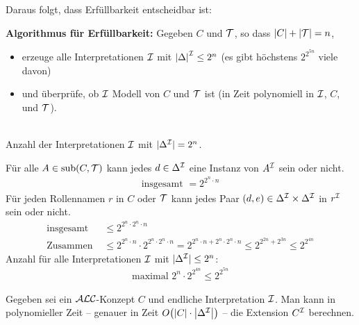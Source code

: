 Daraus folgt, dass Erfüllbarkeit entscheidbar ist:

\textbf{Algorithmus für Erfüllbarkeit:}
Gegeben $C$ und $\mathcal{T}$, so dass $|C|+|\mathcal{T}| = n$,
\begin{itemize} 
  \item erzeuge alle Interpretationen $\mathcal{I}$ mit $\left| \Delta \right|^\MI \leq 2^{n}$ (es gibt höchstens $2^{2^{5n}}$ viele davon) 
  \item und überprüfe, ob $\mathcal{I}$ Modell von $C$ und $\mathcal{T}$ ist (in Zeit polynomiell in $\mathcal{I}$, $C$, und $\mathcal{T}$).
\end{itemize}

\begin{tafel}\mbox{}\\
    Anzahl der Interpretationen $\mathcal{I}$ mit $|\Delta^{\mathcal{I}}| = 2^n$.
    
    Für alle $A \in \operatorname{sub}(C, \mathcal{T})$ kann jedes $d \in \Delta^{\mathcal{I}}$ eine Instanz von $A^{\mathcal{I}}$ sein oder nicht.
    \begin{align*}
        \text{insgesamt } = 2^{2^{n} \cdot n}
    \end{align*}
    Für jeden Rollennamen $r$ in $C$ oder $\mathcal{T}$ kann jedes Paar $(d, e) \in \Delta^{\mathcal{I}} \times \Delta^{\mathcal{I}}$ in $r^{\mathcal{I}}$ sein oder nicht.
    \begin{align*}
        \text{insgesamt } &\leq 2^{2^n \cdot 2^n \cdot n}\\
        \text{Zusammen } &\leq 2^{2^n \cdot n} \cdot 2^{2^n \cdot 2^n \cdot n} = 2^{2^n \cdot n + 2^n \cdot 2^n \cdot n} \leq 2^{2^{2n} + 2^{3n}} \leq 2^{2^{4n}}
    \end{align*}
    Anzahl für alle Interpretationen $\mathcal{I}$ mit $|\Delta^{\mathcal{I}}| \leq 2^n$:
    \begin{align*}
        \text{maximal } 2^n \cdot 2^{2^{4n}} \leq 2^{2^{5n}}
    \end{align*}
\end{tafel}

\begin{lemma}
    \label{lem:extensionsberechnung}
Gegeben sei ein $\mathcal{A}\mathcal{L}\mathcal{C}$-Konzept $C$ und endliche Interpretation $\mathcal{I}$. Man kann in polynomieller Zeit -- genauer in Zeit $O\left( \left| C \right| \cdot \left| \Delta^\MI \right| \right)$ -- die Extension $C^{\mathcal{I}}$ berechnen.
\end{lemma}

